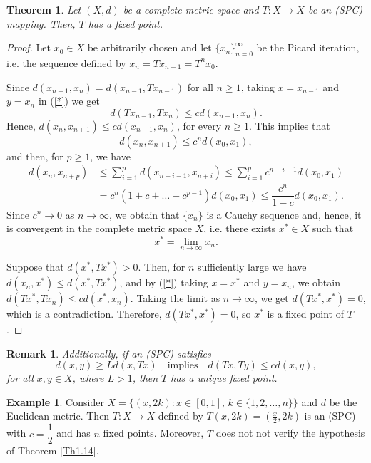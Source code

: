 \documentclass[12 pt]{article}
\theoremstyle{lema}
\theoremstyle{proposition}
\theoremstyle{theorem}
\newtheorem{theorem}{Theorem}[section]
\theoremstyle{theorem}
\newtheorem{remark}{Remark}[section]
\theoremstyle{corollary}
\theoremstyle{definition}
\theoremstyle{example}
\newtheorem{example}{Example}[section]
\begin{document}
	\begin{theorem}
		Let \((X,d)\) be a complete metric space and \(T : X \to X \) be an (SPC) mapping. Then, \(T\) has a fixed point.
		\label{Th2.25}
	\end{theorem}

	\begin{proof}
		Let \(x_0 \in X\) be arbitrarily chosen and let \(\{x_n\}_{n=0}^{\infty}\) be the Picard iteration, i.e. the sequence defined by \(x_n = Tx_{n-1} = T^nx_0\). 
		
		Since \(d(x_{n-1},x_n) = d(x_{n-1}, Tx_{n-1})\) for all \(n \geq 1\), taking \(x=x_{n-1}\) and \(y=x_n\) in (\ref{*}) we get 
		\[d(Tx_{n-1},Tx_n) \leq c d(x_{n-1},x_n).\]
		Hence, \(d(x_n,x_{n+1}) \leq c d(x_{n-1},x_n)\), for every \(n \geq 1\). This implies that 
		\[d(x_{n},x_{n+1}) \leq c^n d(x_{0},x_1),\]
		and then, for \(p \geq 1\), we have
		\begin{align*}
			d(x_n, x_{n+p}) &\leq \sum_{i=1}^p d(x_{n+i-1},x_{n+i}) \leq \sum_{i=1}^p c^{n+i-1} d(x_{0},x_{1})\\
			& = c^n (1+c+\dots+c^{p-1}) d(x_0,x_1) \leq \dfrac{c^n}{1-c} d(x_0,x_1).
		\end{align*}
		Since \(c^n \to 0\) as \(n \to \infty\), we obtain that \(\{x_n\}\) is a Cauchy sequence and, hence, it is convergent in the complete metric space \(X\), i.e. there exists \(x^* \in X\) such that 
		\[x^* = \lim\limits_{n\to \infty} x_n.\]
		
		Suppose that \(d(x^*,Tx^*) > 0.\) Then, for \(n\) sufficiently large we have \(d(x_n,x^*)\leq d(x^*,Tx^*)\), and by (\ref{*}) taking \(x=x^*\) and \(y=x_n\), we obtain \(d(Tx^*,Tx_n)\leq cd(x^*,x_n)\). Taking the limit as \(n \to \infty\), we get \(d(Tx^*,x^*) = 0\), which is a contradiction. Therefore, \(d(Tx^*,x^*) = 0\), so \(x^*\) is a fixed point of \(T\).
	\end{proof}
	
	\begin{remark}
		Additionally, if an (SPC) satisfies 
		\[d(x,y) \geq L d(x,Tx) \quad \text{implies} \quad d(Tx,Ty) \leq c d(x,y),\]
		for all \(x,y \in X\), where \(L > 1\), then \(T\) has a unique fixed point.
	\end{remark}

	\begin{example}
		Consider $X = \{(x,2k) : x \in [0,1],\, k \in \{1,2,\dots,n\}\}$ and \(d\) be the Euclidean metric. Then \(T:X \to X\) defined by \(T(x,2k) = \left(\frac{x}2,2k \right)\) is an (SPC) with \(c=\dfrac12\) and has \(n\) fixed points. Moreover, \(T\) does not not verify the hypothesis of Theorem \ref{Th1.14}.
	\end{example}
\end{document}
